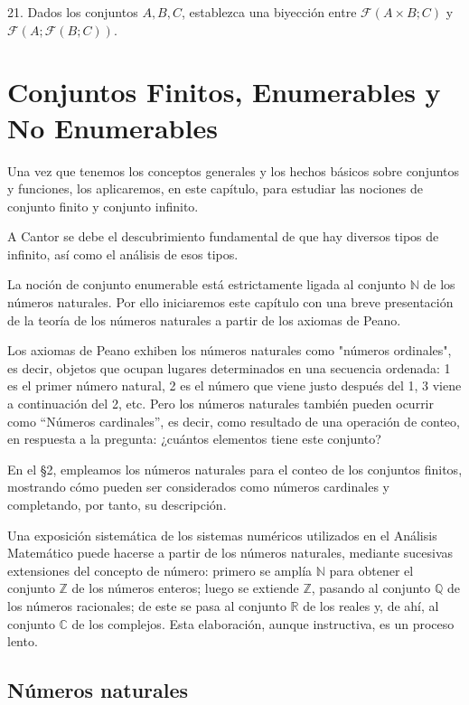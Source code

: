 \documentclass[12pt,oneside]{book}
\begin{document}
21. Dados los conjuntos \(A, B, C\), establezca una biyección entre \(\mathcal{F}(A \times B; C)\) y \(\mathcal{F}(A; \mathcal{F}(B; C))\).

\newpage

\chapter{Conjuntos Finitos, Enumerables y No Enumerables}

Una vez que tenemos los conceptos generales y los hechos básicos sobre conjuntos y funciones, los aplicaremos, en este capítulo, para estudiar las nociones de conjunto finito y conjunto infinito.

A Cantor se debe el descubrimiento fundamental de que hay diversos tipos de infinito, así como el análisis de esos tipos.

La noción de conjunto enumerable está estrictamente ligada al conjunto \(\mathbb{N}\) de los números naturales. Por ello iniciaremos este capítulo con una breve presentación de la teoría de los números naturales a partir de los axiomas de Peano.

Los axiomas de Peano exhiben los números naturales como "números ordinales", es decir, objetos que ocupan lugares determinados en una secuencia ordenada: 1 es el primer número natural, 2 es el número que viene justo después del 1, 3 viene a continuación del 2, etc. Pero los números naturales también pueden ocurrir como “Números cardinales”, es decir, como resultado de una operación de conteo, en respuesta a la pregunta: ¿cuántos elementos tiene este conjunto?

En el §2, empleamos los números naturales para el conteo de los conjuntos finitos, mostrando cómo pueden ser considerados como números cardinales y completando, por tanto, su descripción.

Una exposición sistemática de los sistemas numéricos utilizados en el Análisis Matemático puede hacerse a partir de los números naturales, mediante sucesivas extensiones del concepto de número: primero se amplía \(\mathbb{N}\) para obtener el conjunto \(\mathbb{Z}\) de los números enteros; luego se extiende \(\mathbb{Z}\), pasando al conjunto \(\mathbb{Q}\) de los números racionales; de este se pasa al conjunto \(\mathbb{R}\) de los reales y, de ahí, al conjunto \(\mathbb{C}\) de los complejos. Esta elaboración, aunque instructiva, es un proceso lento.

\section{Números naturales}
\end{document}
